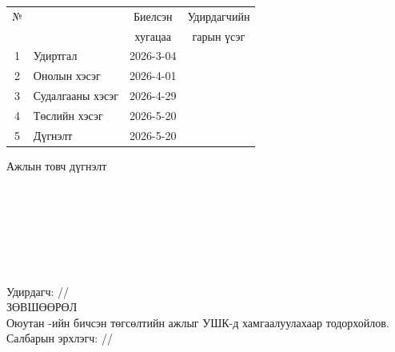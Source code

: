 \begin{titlepage}
\begin{center}
\begin{tabular}{|c|p{7cm}|c|c|}
	\hline
	№ & \makebox[7cm][c]{Хийж гүйцэтгэсэн ажил} & Биелсэн     & Удирдагчийн \\
	  &                    & хугацаа    & гарын үсэг \\ \hline
    1 & {Удиртгал}         & 2026-3-04 & \\ \hline
    2 & {Онолын хэсэг}     & 2026-4-01 & \\ \hline
    3 & {Судалгааны хэсэг} & 2026-4-29 & \\ \hline
    4 & {Төслийн хэсэг}    & 2026-5-20 & \\ \hline
    5 & {Дүгнэлт}          & 2026-5-20 & \\ \hline
\end{tabular}

\vspace{1cm}
Ажлын товч дүгнэлт \\[0.5cm]
\dotfill \\[0.2cm]
\dotfill \\[0.2cm]
\dotfill \\[0.2cm]
\dotfill \\[0.2cm]
\dotfill \\[0.2cm]
\dotfill \\[0.2cm]
\dotfill \\[0.5cm]
Удирдагч: \makebox[3cm]{\dotfill} /\supname/ \\

\vspace{2cm}
ЗӨВШӨӨРӨЛ \\[0.5cm]
Оюутан \shortname -ийн бичсэн төгсөлтийн ажлыг УШК-д хамгаалуулахаар тодорхойлов.\\[0.5cm]
Салбарын эрхлэгч: \makebox[3cm]{\dotfill} /\chairname/
\end{center}

\end{titlepage}

\newpage

